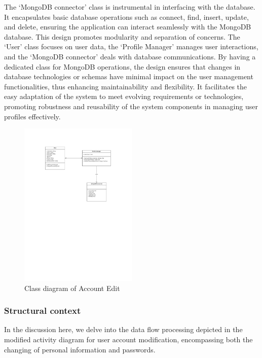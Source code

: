 \documentclass[conference]{IEEEtran}
\begin{document}
The ‘MongoDB connector’ class is instrumental in interfacing with the database. It encapsulates basic database operations such as connect, find, insert, update, and delete, ensuring the application can interact seamlessly with the MongoDB database.
This design promotes modularity and separation of concerns. The ‘User’ class focuses on user data, the ‘Profile Manager’ manages user interactions, and the ‘MongoDB connector’ deals with database communications. By having a dedicated class for MongoDB operations, the design ensures that changes in database technologies or schemas have minimal impact on the user management functionalities, thus enhancing maintainability and flexibility. It facilitates the easy adaptation of the system to meet evolving requirements or technologies, promoting robustness and reusability of the system components in managing user profiles effectively.
\begin{figure}[htbp]
	\centerline{\includegraphics[width=0.5\textwidth]{Diagram_of_Editing_Info_and_Password/Class_diagram_of_editing_and_Changing_psw.pdf}}
	\caption{Class diagram of Account Edit }
	\label{Class_diagram_of_editing_and_Changing_psw}
\end{figure}
\subsubsection{\textbf{Structural context }}
\textbf{ }

In the discussion here, we delve into the data flow processing depicted in the modified activity diagram for user account modification, encompassing both the changing of personal information and passwords.
\end{document}
